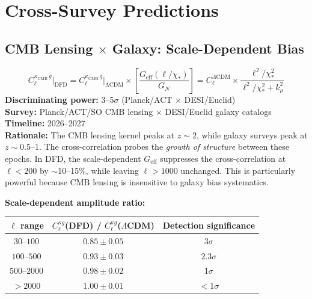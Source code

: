 \documentclass[12pt]{article}
\newcommand{\LCDM}{$\Lambda$CDM}
\begin{document}
\section{Cross-Survey Predictions}
\label{sec:cross}

\subsection{CMB Lensing $\times$ Galaxy: Scale-Dependent Bias}

\begin{crossbox}
\begin{equation}
\boxed{
C_\ell^{\kappa_\mathrm{CMB}\,g}\bigg|_\mathrm{DFD} = C_\ell^{\kappa_\mathrm{CMB}\,g}\bigg|_\mathrm{\Lambda CDM} \times \left[\frac{G_\mathrm{eff}(\ell/\chi_*)}{G_N}\right] = C_\ell^{\Lambda\mathrm{CDM}} \times \frac{\ell^2/\chi_*^2}{\ell^2/\chi_*^2 + k_\mu^2}
}
\end{equation}
\textbf{Discriminating power:} 3--5$\sigma$ (Planck/ACT $\times$ DESI/Euclid)\\
\textbf{Survey:} Planck/ACT/SO CMB lensing $\times$ DESI/Euclid galaxy catalogs\\
\textbf{Timeline:} 2026--2027\\
\textbf{Rationale:} The CMB lensing kernel peaks at $z \sim 2$, while galaxy surveys peak at $z \sim 0.5$--1. The cross-correlation probes the \emph{growth of structure} between these epochs. In DFD, the scale-dependent $G_\mathrm{eff}$ suppresses the cross-correlation at $\ell < 200$ by $\sim$10--15\%, while leaving $\ell > 1000$ unchanged. This is particularly powerful because CMB lensing is insensitive to galaxy bias systematics.

\medskip\noindent
\textbf{Scale-dependent amplitude ratio:}
\begin{center}
\begin{tabular}{ccc}
\toprule
$\ell$ range & $C_\ell^{\kappa g}$(DFD) / $C_\ell^{\kappa g}$(\LCDM) & Detection significance \\
\midrule
$30$--$100$ & $0.85 \pm 0.05$ & 3$\sigma$ \\
$100$--$500$ & $0.93 \pm 0.03$ & 2.3$\sigma$ \\
$500$--$2000$ & $0.98 \pm 0.02$ & 1$\sigma$ \\
$>2000$ & $1.00 \pm 0.01$ & $<1\sigma$ \\
\bottomrule
\end{tabular}
\end{center}
\end{crossbox}
\end{document}
